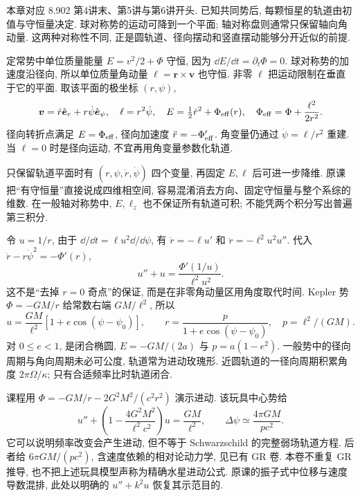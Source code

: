 
本章对应 8.902 第4讲末、第5讲与第6讲开头. 已知共同势后, 每颗恒星的轨道由初值与守恒量决定. 球对称势的运动可降到一个平面; 轴对称盘则通常只保留轴向角动量. 这两种对称性不同, 正是圆轨道、径向摆动和竖直摆动能够分开近似的前提.

定常势中单位质量能量 $E=v^2/2+\Phi$ 守恒, 因为 $\dd E/\dd t=\partial_t\Phi=0$. 球对称势的加速度沿径向, 所以单位质量角动量 $\boldsymbol\ell=\boldsymbol r\times\boldsymbol v$ 也守恒. 非零 $\boldsymbol\ell$ 把运动限制在垂直于它的平面. 取该平面的极坐标 $(r,\psi)$,
\[
\boldsymbol v=\dot r\hat{\boldsymbol e}_r+r\dot\psi\hat{\boldsymbol e}_\psi,
\quad \ell=r^2\dot\psi,
\quad E=\tfrac12\dot r^2+\Phi_{\rm eff}(r),
\quad\Phi_{\rm eff}=\Phi+\frac{\ell^2}{2r^2}.
\]
径向转折点满足 $E=\Phi_{\rm eff}$, 径向加速度 $\ddot r=-\Phi_{\rm eff}'$. 角变量仍通过 $\dot\psi=\ell/r^2$ 重建. 当 $\ell=0$ 时是径向运动, 不宜再用角变量参数化轨道.

只保留轨道平面时有 $(r,\psi,\dot r,\dot\psi)$ 四个变量, 再固定 $E,\ell$ 后可进一步降维. 原课把“有守恒量”直接说成四维相空间, 容易混淆消去方向、固定守恒量与整个系综的维数. 在一般轴对称势中, $E,\ell_z$ 也不保证所有轨道可积; 不能凭两个积分写出普遍第三积分.

令 $u=1/r$, 由于 $\dd/\dd t=\ell u^2\dd/\dd\psi$, 有 $\dot r=-\ell u'$ 和 $\ddot r=-\ell^2u^2u''$. 代入 $\ddot r-r\dot\psi^2=-\Phi'(r)$,
\[
u''+u=\frac{\Phi'(1/u)}{\ell^2u^2}.
\]
这不是“去掉 $r=0$ 奇点”的保证, 而是在非零角动量区用角度取代时间. Kepler 势 $\Phi=-GM/r$ 给常数右端 $GM/\ell^2$, 所以
\[
u=\frac{GM}{\ell^2}[1+e\cos(\psi-\psi_0)],\qquad
r=\frac{p}{1+e\cos(\psi-\psi_0)},\quad p=\ell^2/(GM).
\]
对 $0\le e<1$, 是闭合椭圆, $E=-GM/(2a)$ 与 $p=a(1-e^2)$. 一般势中的径向周期与角向周期未必可公度, 轨道常为进动玫瑰形. 近圆轨道的一径向周期积累角度 $2\pi\Omega/\kappa$; 只有合适频率比时轨道闭合.

课程用 $\Phi=-GM/r-2G^2M^2/(c^2r^2)$ 演示进动. 该玩具中心势给
\[
u''+\left(1-\frac{4G^2M^2}{\ell^2c^2}\right)u=\frac{GM}{\ell^2},
\qquad \Delta\psi\simeq\frac{4\pi GM}{pc^2}.
\]
它可以说明频率改变会产生进动, 但不等于 Schwarzschild 的完整弱场轨道方程. 后者给 $6\pi GM/(pc^2)$, 含速度依赖的相对论动力学, 见已有 GR 卷. 本卷不重复 GR 推导, 也不把上述玩具模型声称为精确水星进动公式. 原课的振子式中位移与速度导数混排, 此处以明确的 $u''+k^2u$ 恢复其示范目的.

